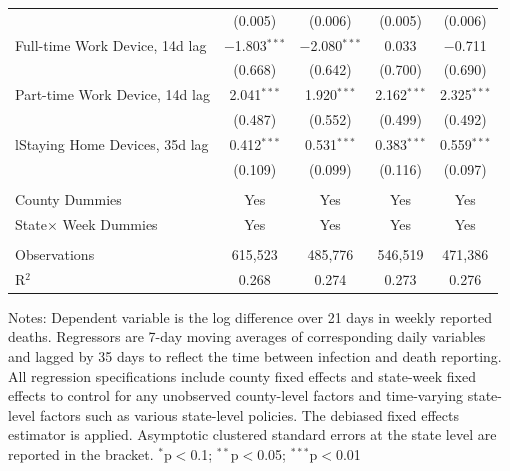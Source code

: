 \documentclass[9pt,twoside,lineno]{pnas-new}
\theoremstyle{definition}
\begin{document}
\begin{table}[!htbp]
{\begin{tabular}{@{\extracolsep{1pt}}lcc|cc}
  & (0.005) & (0.006) & (0.005) & (0.006) \\ 
    Full-time Work Device, 14d  lag& $-$1.803$^{***}$ & $-$2.080$^{***}$ & 0.033 & $-$0.711 \\ 
  & (0.668) & (0.642) & (0.700) & (0.690) \\ 
  Part-time Work Device, 14d  lag& 2.041$^{***}$ & 1.920$^{***}$ & 2.162$^{***}$ & 2.325$^{***}$ \\ 
  & (0.487) & (0.552) & (0.499) & (0.492) \\ 
  lStaying Home Devices, 35d lag& 0.412$^{***}$ & 0.531$^{***}$ & 0.383$^{***}$ & 0.559$^{***}$ \\ 
  & (0.109) & (0.099) & (0.116) & (0.097) \\ 
 \hline \\[-1.8ex]  
County Dummies & Yes & Yes &  Yes  &  Yes  \\   
State$\times$ Week Dummies&Yes & Yes &  Yes  &  Yes  \\ 
\hline \\[-1.8ex] 
Observations & 615,523 & 485,776 & 546,519 & 471,386 \\ 
R$^{2}$ & 0.268 & 0.274 & 0.273 & 0.276 \\  \hline 
\hline %
\end{tabular}}	
  {\scriptsize
\begin{flushleft}
Notes: Dependent variable is the log difference over 21 days in weekly reported deaths. Regressors are 7-day moving averages of corresponding daily variables and lagged by 35 days to reflect the time between infection and  death reporting. All regression specifications include county fixed effects and state-week fixed effects to control for any unobserved county-level factors and time-varying state-level factors such as various state-level policies. 
The debiased fixed effects estimator is applied.  Asymptotic clustered standard errors at the state level are reported in the bracket.  {$^{*}$p$<$0.1; $^{**}$p$<$0.05; $^{***}$p$<$0.01}
\end{flushleft}}   
\end{table} 

 
\end{document}
